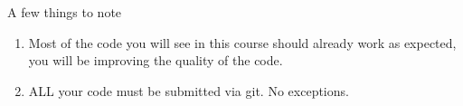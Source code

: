 \begin{frame}{A few things to note}
    \begin{enumerate}
        \item Most of the code you will see in this course should already work as expected, you will be improving the quality of the code.
        \pause
        \item ALL your code must be submitted via git. No exceptions.
    \end{enumerate}
\end{frame}